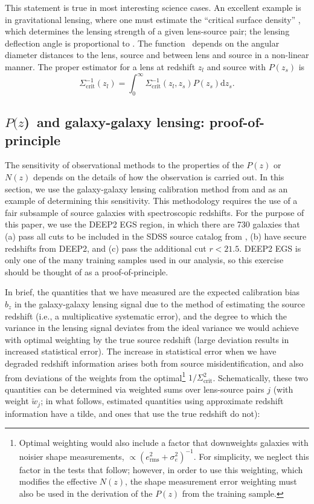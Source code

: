 \documentclass[preprint]{aastex}
\newcommand{\pofz}{$P(z$)}
\begin{document}
This statement is true in most interesting science cases.  An excellent example is in
gravitational lensing, where one must estimate the ``critical surface density''
\sigmacrit, which determines the lensing strength of a given lens-source pair; the
lensing deflection angle is proportional to \scinv.  The function
\sigmacrit\ depends on the angular diameter distances to the lens, source and
between lens and source in a non-linear manner.  The proper estimator for a lens
at redshift $z_{l}$ and source with $P(z_s)$ is
\begin{equation} \label{eq:calcscrit}
\Sigma^{-1}_{\mathrm{crit}}(z_l) = 
    \int_{0}^{\infty} \Sigma_{\mathrm{crit}}^{-1}(z_l, z_s) P(z_s) \mathrm{d}z_s.
\end{equation}


\subsection{\pofz\ and galaxy-galaxy lensing: proof-of-principle} \label{sec:pofp}

The sensitivity of observational methods to the properties of the
$P(z)$ or $N(z)$ depends on the details of how the observation is
carried out.  In
this section, we use the galaxy-galaxy lensing calibration method from
\cite{man08} and \citet{Nakajima11} as an example of determining this
sensitivity.  This methodology requires the use of a fair subsample of
source galaxies with spectroscopic redshifts.  For the purpose of this
paper, we use the DEEP2 EGS region, in which there are 730 galaxies
that (a) pass all cuts to be included in the SDSS source catalog from
\citet{MandelbaumSystematics05}, (b) have secure redshifts from DEEP2,
and (c) pass the additional cut $r<21.5$. 
DEEP2 EGS is only one of the many training samples used in our
analysis, 
so this exercise should be thought of as a proof-of-principle.

In brief, the quantities that we have measured are the expected calibration
bias $b_z$ in the galaxy-galaxy lensing signal due to the method of estimating
the source redshift (i.e., a multiplicative systematic error), and the degree to
which the variance in the lensing signal deviates from the ideal variance we
would achieve with optimal weighting by the true source redshift (large
deviation results in increased statistical error).  The increase in statistical
error when we have degraded redshift information arises both from source
misidentification, and also from deviations of the weights from the
optimal\footnote{Optimal weighting would also include a factor that downweights
galaxies with noisier shape measurements, $\propto (e_\mathrm{rms}^2 +
\sigma_e^2)^{-1}$.  For simplicity, we neglect this factor in the tests that
follow; however, in order to use this weighting, which modifies the effective
$N(z)$, the shape measurement error weighting must also be used in the
derivation of the $P(z)$ from the training sample.} $1/\Sigma_\mathrm{crit}^2$.
Schematically, these two quantities can be determined via weighted sums over
lens-source pairs $j$ (with weight $\tilde{w}_j$; in what follows, estimated
quantities using approximate redshift information have a tilde, and ones that
use the true redshift do not):
\end{document}
